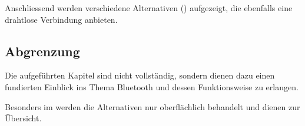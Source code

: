 Anschliessend werden verschiedene Alternativen () aufgezeigt, die ebenfalls eine drahtlose Verbindung anbieten.

\subsection{Abgrenzung}
Die aufgeführten Kapitel sind nicht vollständig, sondern dienen dazu einen fundierten Einblick ins Thema Bluetooth und dessen Funktionsweise zu erlangen.

Besonders im  werden die Alternativen nur oberflächlich behandelt und dienen zur Übersicht.
